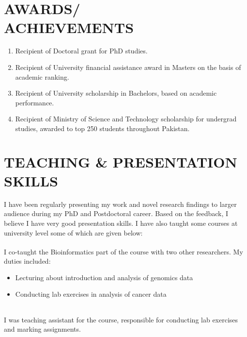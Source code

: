 \documentclass[margin, 10pt]{res} %
\begin{document}
\begin{resume}
\section{AWARDS/ \\ ACHIEVEMENTS} 

\begin{enumerate}
\item Recipient of Doctoral grant for PhD studies.
\item Recipient of University financial assistance award in Masters on the basis of academic ranking.
\item Recipient of University scholarship in Bachelors, based on academic performance.
\item Recipient of Ministry of Science and Technology scholarship for undergrad studies, awarded to top 250 students throughout Pakistan.
\end{enumerate} 


\section{TEACHING \& PRESENTATION SKILLS}
I have been regularly presenting my work and novel research findings to larger audience during my PhD and Postdoctoral career. Based on the feedback, I believe I have very good presentation skills. I have also taught some courses at university level some of which are given below: \\

{\bf \color{Brown}{Molecular Oncology and Biostatistics, 2017}} \\
I co-taught the Bioinformatics part of the course with two other researchers. My duties included: 
\begin{itemize} 
\item Lecturing about introduction and analysis of genomics data 
\item Conducting lab exercises in analysis of cancer data
\end{itemize} 
{\bf \color{Brown}{Advanced Software Engineering, 2008}} \\
I was teaching assistant for the course, responsible for conducting lab exercises and marking assignments.




\end{resume}
\end{document}
